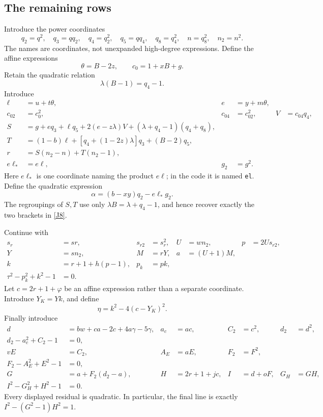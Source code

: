 \documentclass[11pt]{article}
\begin{document}
\subsection{The remaining rows}
Introduce the power coordinates
\[
 q_2=q^2,\quad q_3=qq_2,\quad q_4=q_2^2,\quad q_5=qq_4,
 \quad q_8=q_4^2,\quad n=q_8^2,\quad n_2=n^2.
\]
The names are coordinates, not unexpanded high-degree expressions.
Define the affine expressions
\[
 \theta=B-2z,\qquad c_0=1+xB+g.
\]
Retain the quadratic relation
\[
 \lambda(B-1)=q_4-1.
\]
Introduce
\begin{align*}
 \ell&=u+t\theta,&e&=y+m\theta,\\
 c_{02}&=c_0^2,&c_{04}&=c_{02}^2,&V&=c_{04}q_4,\\
 S&=g+eq_3+\ell q_5+2(e-z\lambda)V
                      +(\lambda+q_4-1)(q_4+q_8),\\
 T&=(1-b)\ell+[q_4+(1-2z)\lambda]q_3+(B-2)q_5,\\
 r&=S(n_2-n)+T(n_2-1),\\
 e\ell_*&=e\ell,&g_2&=g^2.
\end{align*}
Here \(e\ell_*\) is one coordinate naming the product \(e\ell\);
in the code it is named \texttt{el}. Define the quadratic expression
\[
 \alpha=(b-xy)q_2-e\ell_*g_2.
\]
The regroupings of \(S,T\) use only
\(\lambda B=\lambda+q_4-1\), and hence recover exactly the two
brackets in \eqref{J8}.

Continue with
\begin{align*}
 s_r&=sr,&s_{r2}&=s_r^2,&U&=wn_2,&p&=2Us_{r2},\\
 Y&=sn_2,&M&=rY,&a&=(U+1)M,\\
 k&=r+1+h(p-1),&p_k&=pk,\\
 \tau^2-p_k^2+k^2-1&=0.
\end{align*}
Let \(c=2r+1+\varphi\) be an affine expression rather than a separate
coordinate. Introduce \(Y_K=Yk\), and define
\[
 \eta=k^2-4(c-Y_K)^2.
\]
Finally introduce
\begin{align*}
 d&=bw+ca-2c+4a\gamma-5\gamma,&a_c&=ac,&C_2&=c^2,&d_2&=d^2,\\
 d_2-a_c^2+C_2-1&=0,\\
 vE&=C_2,&A_E&=aE,&F_2&=F^2,\\
 F_2-A_E^2+E^2-1&=0,\\
 G&=a+F_2(d_2-a),&H&=2r+1+jc,&I&=d+oF,&G_H&=GH,\\
 I^2-G_H^2+H^2-1&=0.
\end{align*}
Every displayed residual is quadratic. In particular, the final line is
exactly \(I^2-(G^2-1)H^2=1\).
\end{document}
